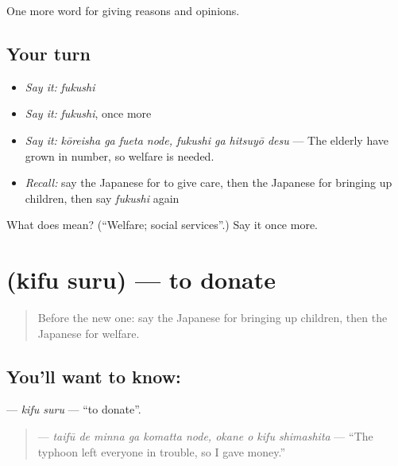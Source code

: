 \begin{grammarlens}[title={What you've built}]
One more word for giving reasons and opinions.
\end{grammarlens}

\subsection*{Your turn}
\begin{itemize}
\raggedright
  \item \emph{Say it:} \emph{fukushi}
  \item \emph{Say it:} \emph{fukushi}, once more
  \item \emph{Say it:} \emph{kōreisha ga fueta node, fukushi ga hitsuyō desu} — The elderly have grown in number, so welfare is needed.
  \item \emph{Recall:} say the Japanese for to give care, then the Japanese for bringing up children, then say \emph{fukushi} again
\end{itemize}

\begin{tcolorbox}[breakable,colback=teal!4,colframe=teal!35!black,title={Before you move on}]
What does  mean? (\textquotedblleft{}Welfare; social services\textquotedblright{}.) Say it once more.
\end{tcolorbox}
\section[\texorpdfstring{\ja{きふする} (kifu suru)}{きふする (kifu suru)}]{ (kifu suru) — to donate}

\label{lesson:JA-C334-kifu-suru}



\begin{quote}
Before the new one: say the Japanese for bringing up children, then the Japanese for welfare.
\end{quote}

\subsection*{You'll want to know: }
\textbf{} — \emph{kifu suru} — \textquotedblleft{}to donate\textquotedblright{}.

\begin{quote}
\textbf{   } — \emph{taifū de minna ga komatta node, okane o kifu shimashita} — \textquotedblleft{}The typhoon left everyone in trouble, so I gave money.\textquotedblright{}
\end{quote}

